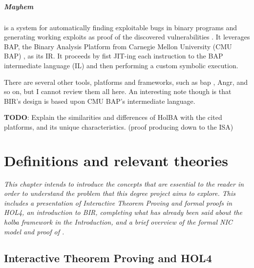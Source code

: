 \documentclass{kththesis}
\begin{document}
\paragraph{Mayhem} is a system for automatically finding exploitable bugs in binary programs and generating working exploits as proof of the discovered vulnerabilities \cite{cha_unleashing_2012}. It leverages BAP, the Binary Analysis Platform from Carnegie Mellon University (CMU BAP) \cite{brumley_bap:_2011}, as its IR. It proceeds by fist JIT-ing each instruction to the BAP intermediate language (IL) and then performing a custom symbolic execution.

There are several other tools, platforms and frameworks, such as \gls{bap} \cite{noauthor_binary_2019}, Angr, and so on, but I cannot review them all here. An interesting note though is that BIR's design is based upon CMU BAP's intermediate language.

\textbf{TODO}: Explain the similarities and differences of HolBA with the cited platforms, and its unique characteristics. (proof producing down to the ISA)




\chapter{Definitions and relevant theories}
\vspace{-1cm}
\textit{This chapter intends to introduce the concepts that are essential to the reader in order to understand the problem that this degree project aims to explore. This includes a presentation of Interactive Theorem Proving and formal proofs in HOL4, an introduction to \gls{BIR}, completing what has already been said about the \gls{holba} framework in the Introduction, and a brief overview of the formal NIC model and proof of \cite{haglund_formal_2016}.}

\section{Interactive Theorem Proving and HOL4}
\end{document}

